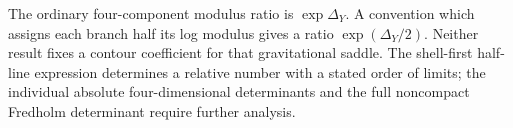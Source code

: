 The ordinary four-component modulus ratio is $\exp\Delta_Y$. A convention which assigns each branch half its log modulus gives a ratio $\exp(\Delta_Y/2)$. Neither result fixes a contour coefficient for that gravitational saddle. The shell-first half-line expression determines a relative number with a stated order of limits; the individual absolute four-dimensional determinants and the full noncompact Fredholm determinant require further analysis.
